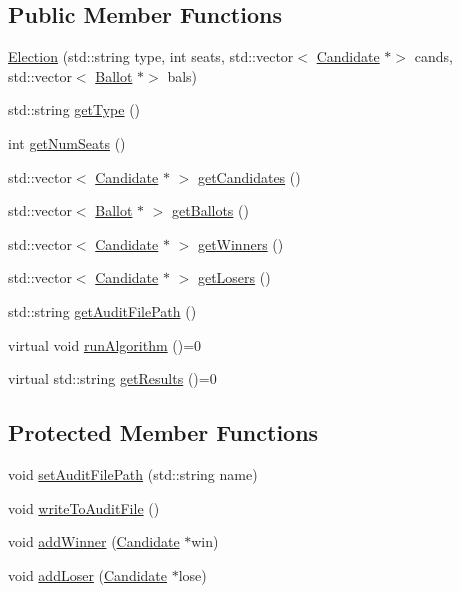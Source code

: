\subsection*{Public Member Functions}
\begin{DoxyCompactItemize}
\item 
\hyperlink{classElection_a4f6dd551dbe4276f97b565ce2fd8fb5d}{Election} (std\+::string type, int seats, std\+::vector$<$ \hyperlink{classCandidate}{Candidate} $\ast$$>$ cands, std\+::vector$<$ \hyperlink{classBallot}{Ballot} $\ast$$>$ bals)
\item 
std\+::string \hyperlink{classElection_ae49e7f5d36d4afc23ed81b4df4ae658c}{get\+Type} ()
\item 
int \hyperlink{classElection_a0b68106ee52f33286364ef5d617d77ee}{get\+Num\+Seats} ()
\item 
std\+::vector$<$ \hyperlink{classCandidate}{Candidate} $\ast$ $>$ \hyperlink{classElection_a1514ca134f88464b026cc51da5076d29}{get\+Candidates} ()
\item 
std\+::vector$<$ \hyperlink{classBallot}{Ballot} $\ast$ $>$ \hyperlink{classElection_abd0c0a7649a3f5d87541e3f65fec7244}{get\+Ballots} ()
\item 
std\+::vector$<$ \hyperlink{classCandidate}{Candidate} $\ast$ $>$ \hyperlink{classElection_a8cc211952aa00399649c8660eb62189c}{get\+Winners} ()
\item 
std\+::vector$<$ \hyperlink{classCandidate}{Candidate} $\ast$ $>$ \hyperlink{classElection_a34dfd0c1c6519073d38e85790c839f8b}{get\+Losers} ()
\item 
std\+::string \hyperlink{classElection_ae55fafa9a82cca3c20b2343fed3f7250}{get\+Audit\+File\+Path} ()
\item 
virtual void \hyperlink{classElection_a059659576ebb0416ecd8005f684461d6}{run\+Algorithm} ()=0
\item 
virtual std\+::string \hyperlink{classElection_a6a6f4f301db86628b8d962281a19bf74}{get\+Results} ()=0
\end{DoxyCompactItemize}
\subsection*{Protected Member Functions}
\begin{DoxyCompactItemize}
\item 
void \hyperlink{classElection_ad50f3b2f39c7e7ee96f1987c9dddb926}{set\+Audit\+File\+Path} (std\+::string name)
\item 
void \hyperlink{classElection_abd52b6c894a9f2a0a0a104e9f290f9a7}{write\+To\+Audit\+File} ()
\item 
void \hyperlink{classElection_a6b6bac6b3c0789a311f1daf8e9d4a31c}{add\+Winner} (\hyperlink{classCandidate}{Candidate} $\ast$win)
\item 
void \hyperlink{classElection_a732076e36548e51e8c675598ac4a03dd}{add\+Loser} (\hyperlink{classCandidate}{Candidate} $\ast$lose)
\end{DoxyCompactItemize}
